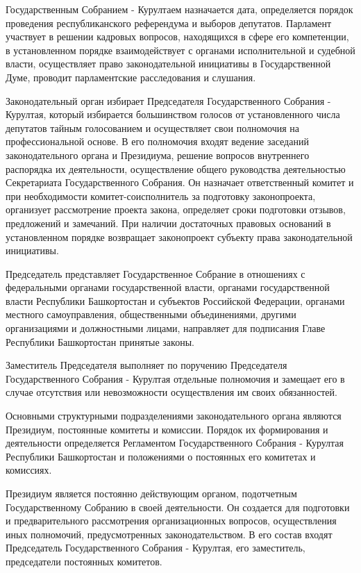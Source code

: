 Государственным Собранием - Курултаем назначается дата, определяется порядок проведения республиканского референдума и выборов депутатов. Парламент участвует в решении кадровых вопросов, находящихся в сфере его компетенции, в установленном порядке взаимодействует с органами исполнительной и судебной власти, осуществляет право законодательной инициативы в Государственной Думе, проводит парламентские расследования и слушания.

Законодательный орган избирает Председателя Государственного Собрания - Курултая, который избирается большинством голосов от установленного числа депутатов тайным голосованием и осуществляет свои полномочия на профессиональной основе. В его полномочия входят ведение заседаний законодательного органа и Президиума, решение вопросов внутреннего распорядка их деятельности, осуществление общего руководства деятельностью Секретариата Государственного Собрания. Он назначает ответственный комитет и при необходимости комитет-соисполнитель за подготовку законопроекта, организует рассмотрение проекта закона, определяет сроки подготовки отзывов, предложений и замечаний. При наличии достаточных правовых оснований в установленном порядке возвращает законопроект субъекту права законодательной инициативы.

Председатель представляет Государственное Собрание в отношениях с федеральными органами государственной власти, органами государственной власти Республики Башкортостан и субъектов Российской Федерации, органами местного самоуправления, общественными объединениями, другими организациями и должностными лицами, направляет для подписания Главе Республики Башкортостан принятые законы.

Заместитель Председателя выполняет по поручению Председателя Государственного Собрания - Курултая отдельные полномочия и замещает его в случае отсутствия или невозможности осуществления им своих обязанностей.

Основными структурными подразделениями законодательного органа являются Президиум, постоянные комитеты и комиссии. Порядок их формирования и деятельности определяется Регламентом Государственного Собрания - Курултая Республики Башкортостан и положениями о постоянных его комитетах и комиссиях.

Президиум является постоянно действующим органом, подотчетным Государственному Собранию в своей деятельности. Он создается для подготовки и предварительного рассмотрения организационных вопросов, осуществления иных полномочий, предусмотренных законодательством. В его состав входят Председатель Государственного Собрания - Курултая, его заместитель, председатели постоянных комитетов.

